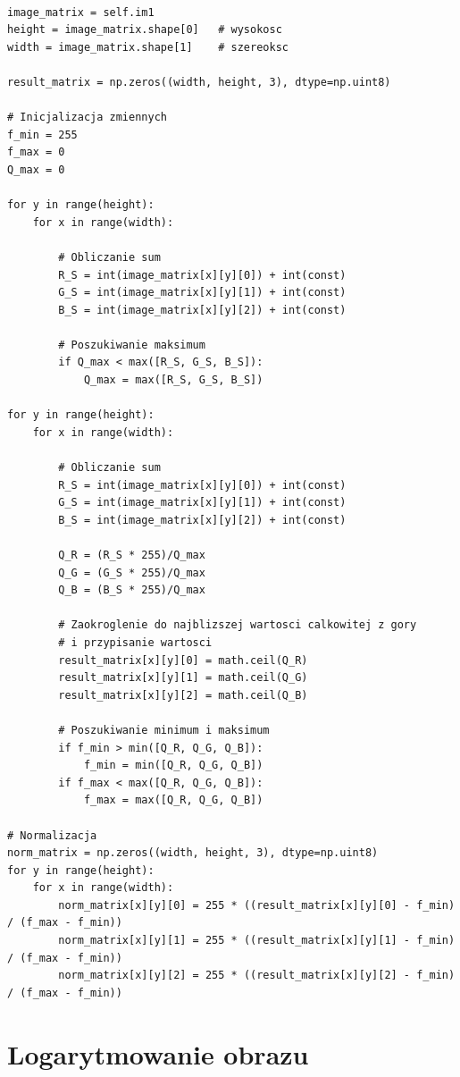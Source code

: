 \documentclass[final,a4paper,openany,12pt]{mwbk}
\begin{document}
\begin{lstlisting}[caption= Pierwiastkowanie obrazu barwowego]

image_matrix = self.im1
height = image_matrix.shape[0]   # wysokosc
width = image_matrix.shape[1]    # szereoksc

result_matrix = np.zeros((width, height, 3), dtype=np.uint8)

# Inicjalizacja zmiennych
f_min = 255
f_max = 0
Q_max = 0

for y in range(height):
    for x in range(width):  

        # Obliczanie sum
        R_S = int(image_matrix[x][y][0]) + int(const)
        G_S = int(image_matrix[x][y][1]) + int(const)
        B_S = int(image_matrix[x][y][2]) + int(const)

        # Poszukiwanie maksimum
        if Q_max < max([R_S, G_S, B_S]):
            Q_max = max([R_S, G_S, B_S])

for y in range(height):
    for x in range(width):  

        # Obliczanie sum
        R_S = int(image_matrix[x][y][0]) + int(const)
        G_S = int(image_matrix[x][y][1]) + int(const)
        B_S = int(image_matrix[x][y][2]) + int(const)

        Q_R = (R_S * 255)/Q_max
        Q_G = (G_S * 255)/Q_max
        Q_B = (B_S * 255)/Q_max
            
        # Zaokroglenie do najblizszej wartosci calkowitej z gory
        # i przypisanie wartosci
        result_matrix[x][y][0] = math.ceil(Q_R)
        result_matrix[x][y][1] = math.ceil(Q_G)
        result_matrix[x][y][2] = math.ceil(Q_B)

        # Poszukiwanie minimum i maksimum                
        if f_min > min([Q_R, Q_G, Q_B]):
            f_min = min([Q_R, Q_G, Q_B])
        if f_max < max([Q_R, Q_G, Q_B]):
            f_max = max([Q_R, Q_G, Q_B])

# Normalizacja
norm_matrix = np.zeros((width, height, 3), dtype=np.uint8)
for y in range(height):
    for x in range(width):
        norm_matrix[x][y][0] = 255 * ((result_matrix[x][y][0] - f_min) / (f_max - f_min))
        norm_matrix[x][y][1] = 255 * ((result_matrix[x][y][1] - f_min) / (f_max - f_min))
        norm_matrix[x][y][2] = 255 * ((result_matrix[x][y][2] - f_min) / (f_max - f_min))

\end{lstlisting}
\newpage

\section{ Logarytmowanie obrazu}
\end{document}
